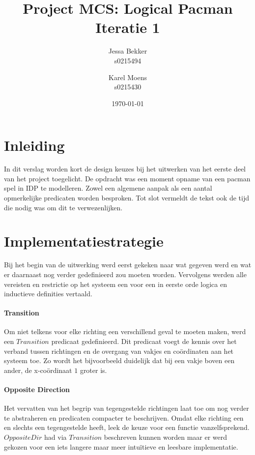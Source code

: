 \documentclass[a4paper,12pt]{article}
\title{Project MCS: Logical Pacman \\ Iteratie 1}
\author{Jessa Bekker\\s0215494 \and Karel Moens \\ s0215430 }
\date{\today}
\begin{document}
\maketitle


\section{Inleiding}
In dit verslag worden kort de design keuzes bij het uitwerken van het eerste deel van het project toegelicht.
De opdracht was een moment opname van een pacman spel in IDP te modelleren. 
Zowel een algemene aanpak als een aantal opmerkelijke predicaten worden besproken.
Tot slot vermeldt de tekst ook de tijd die nodig was om dit te verwezenlijken.

\section{Implementatiestrategie}
Bij het begin van de uitwerking werd eerst gekeken naar wat gegeven werd en wat er daarnaast nog verder gedefinieerd zou moeten worden.
Vervolgens werden alle vereisten en restrictie op het systeem een voor een in eerste orde logica en inductieve definities vertaald.

\paragraph{Transition}
Om niet telkens voor elke richting een verschillend geval te moeten maken, werd een $Transition$ predicaat gedefinieerd.
Dit predicaat voegt de kennis over het verband tussen richtingen en de overgang van vakjes en co\"ordinaten aan het systeem toe.
Zo wordt het bijvoorbeeld duidelijk dat bij een vakje boven een ander, de x-co\"ordinaat $1$ groter is.


\paragraph{Opposite Direction}
Het vervatten van het begrip van tegengestelde \newline richtingen laat toe om nog verder te abstraheren en predicaten compacter te beschrijven. Omdat elke richting een en slechts een tegengestelde heeft, leek de keuze voor een functie vanzelfsprekend. $OppositeDir$ had via $Transition$ beschreven kunnen worden maar er werd gekozen voor een iets langere maar meer intu\"itieve en leesbare implementatie.
\end{document}

